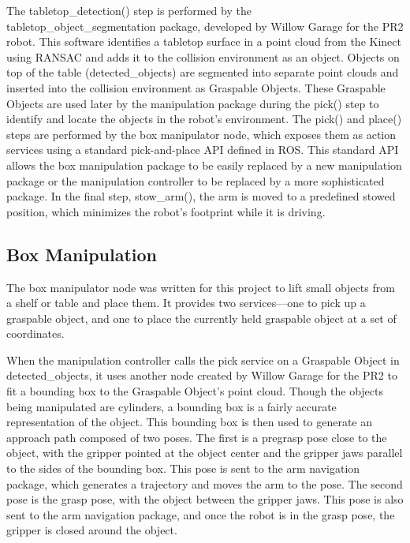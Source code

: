 \documentclass[]{cwru} %
\begin{document}
The tabletop\_detection() step is performed by the
tabletop\_object\_segmentation package, developed by Willow
Garage \cite{tabletop_object_detector} for the PR2 robot. This software identifies a tabletop
surface in a point cloud from the Kinect using RANSAC \cite{fischler} and adds
it to the collision environment as an object. Objects on top of the
table (detected\_objects) are segmented into separate point clouds and
inserted into the collision environment as Graspable Objects. These
Graspable Objects are used later by the manipulation package during the
pick() step to identify and locate the objects in the robot's
environment. The pick() and place() steps are performed by the box
manipulator node, which exposes them as action services using a standard
pick-and-place API defined in ROS. This standard API allows the box
manipulation package to be easily replaced by a new manipulation package
or the manipulation controller to be replaced by a more sophisticated
package. In the final step, stow\_arm(), the arm is moved to a
predefined stowed position, which minimizes the robot's footprint while
it is driving.

\subsection{Box Manipulation}

The box manipulator node was written for this project to lift small
objects from a shelf or table and place them. It provides two
services---one to pick up a graspable object, and one to place the
currently held graspable object at a set of coordinates.

When the manipulation controller calls the pick service on a Graspable
Object in detected\_objects, it uses another node created by Willow
Garage for the PR2 to fit a bounding box to the Graspable Object's point
cloud. Though the objects being manipulated are cylinders, a bounding
box is a fairly accurate representation of the object. This bounding box
is then used to generate an approach path composed of two poses. The
first is a pregrasp pose close to the object, with the gripper pointed
at the object center and the gripper jaws parallel to the sides of the
bounding box. This pose is sent to the arm navigation package, which
generates a trajectory and moves the arm to the pose. The second pose is
the grasp pose, with the object between the gripper jaws. This pose is
also sent to the arm navigation package, and once the robot is in the
grasp pose, the gripper is closed around the object.
\end{document}
